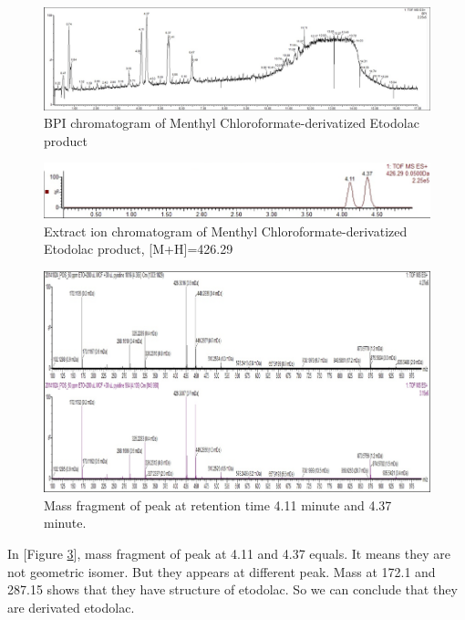 \documentclass[12pt]{article} %
\begin{document}
\begin{figure}[h]
  \includegraphics[width=\linewidth]{bpi.png}
  \caption{BPI chromatogram of Menthyl Chloroformate-derivatized Etodolac product }
  \label{fig:fig2}
\end{figure}
\begin{figure}[h]
  \includegraphics[width=\linewidth]{fig3.png}
  \caption{Extract ion chromatogram of Menthyl Chloroformate-derivatized Etodolac product, [M+H]=426.29}
  \label{fig:fig3}
\end{figure}
\begin{figure}[h!]
  \includegraphics[width=\linewidth]{fig4.png}
  \caption{Mass fragment of peak at retention time 4.11 minute and 4.37 minute.}
  \label{fig:fig4}
\end{figure}

In [Figure \ref{fig:fig4}], mass fragment of peak at 4.11 and 4.37 equals. It means they are not geometric isomer. But they appears at different peak. Mass at 172.1 and 287.15 shows that they have structure of etodolac.\cite{cite3} So we can conclude that they are derivated etodolac. 
\end{document}
